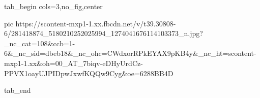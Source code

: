  
 
 
 
 


\ifcmt
  tab_begin cols=3,no_fig,center

     pic https://scontent-mxp1-1.xx.fbcdn.net/v/t39.30808-6/281418874_5180210252025994_1274041676114103373_n.jpg?_nc_cat=108&ccb=1-6&_nc_sid=dbeb18&_nc_ohc=CWdxorRPkEYAX9pKB4y&_nc_ht=scontent-mxp1-1.xx&oh=00_AT_7biqv-eDHyUrdCz-PPVX1oayUJPIDpwJxwfKQQw9Cyg&oe=6288BB4D

  tab_end
\fi

